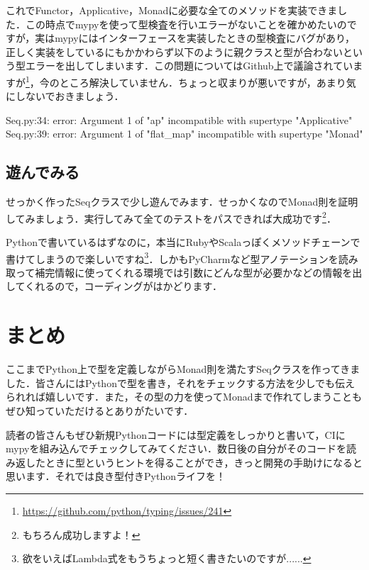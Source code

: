 
これでFunctor，Applicative，Monadに必要な全てのメソッドを実装できました．この時点でmypyを使って型検査を行いエラーがないことを確かめたいのですが，実はmypyにはインターフェースを実装したときの型検査にバグがあり，正しく実装をしているにもかかわらず以下のように親クラスと型が合わないという型エラーを出してしまいます．この問題についてはGithub上で議論されていますが\footnote{\url{https://github.com/python/typing/issues/241}}，今のところ解決していません．ちょっと収まりが悪いですが，あまり気にしないでおきましょう．

\begin{bashcode}
Seq.py:34: error: Argument 1 of "ap" incompatible with supertype "Applicative"
Seq.py:39: error: Argument 1 of "flat_map" incompatible with supertype "Monad"
\end{bashcode}

\subsection{遊んでみる}
せっかく作ったSeqクラスで少し遊んでみます．せっかくなのでMonad則を証明してみましょう．実行してみて全てのテストをパスできれば大成功です\footnote{もちろん成功しますよ！}．

Pythonで書いているはずなのに，本当にRubyやScalaっぽくメソッドチェーンで書けてしまうので楽しいですね\footnote{欲をいえばLambda式をもうちょっと短く書きたいのですが......}．しかもPyCharmなど型アノテーションを読み取って補完情報に使ってくれる環境では引数にどんな型が必要かなどの情報を出してくれるので，コーディングがはかどります．


\section{まとめ}
ここまでPython上で型を定義しながらMonad則を満たすSeqクラスを作ってきました．皆さんにはPythonで型を書き，それをチェックする方法を少しでも伝えられれば嬉しいです．また，その型の力を使ってMonadまで作れてしまうこともぜひ知っていただけるとありがたいです．

読者の皆さんもぜひ新規Pythonコードには型定義をしっかりと書いて，CIにmypyを組み込んでチェックしてみてください．数日後の自分がそのコードを読み返したときに型というヒントを得ることができ，きっと開発の手助けになると思います．それでは良き型付きPythonライフを！
